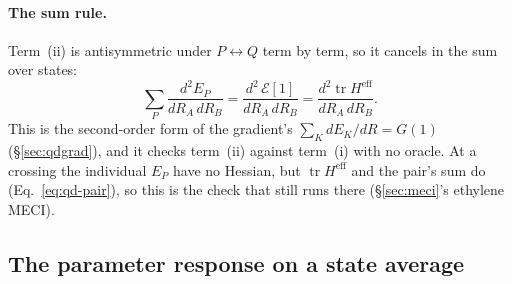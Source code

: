\documentclass[11pt]{article}
\newcommand{\Heff}{H^{\mathrm{eff}}}
\newcommand{\tr}{\operatorname{tr}}
\begin{document}
\paragraph{The sum rule.} Term~(ii) is antisymmetric under $P
\leftrightarrow Q$ term by term, so it cancels in the sum over states:
\begin{equation}
  \sum_P\frac{d^2E_P}{dR_A\,dR_B} = \frac{d^2\,\mathcal E[1]}{dR_A\,dR_B}
  = \frac{d^2\tr\Heff}{dR_A\,dR_B}.
  \label{eq:qd-sum}
\end{equation}
This is the second-order form of the gradient's $\sum_K dE_K/dR = G(1)$
(\S\ref{sec:qdgrad}), and it checks term~(ii) against term~(i) with no
oracle. At a crossing the individual $E_P$ have no Hessian, but $\tr\Heff$
and the pair's sum do (Eq.~\eqref{eq:qd-pair}), so this is the check that
still runs there (\S\ref{sec:meci}'s ethylene MECI).

\subsection{The parameter response on a state average}
\label{sec:qd-response}
\end{document}
